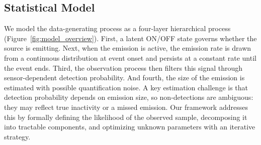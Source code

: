 \documentclass[unnumsec,webpdf,modern,mediumone]{oup-authoring-template}
\begin{document}
\subsection{Statistical Model}
\label{sec:stat_model}

We model the data-generating process as a four-layer hierarchical process (Figure~\ref{fig:model_overview}). First, a latent ON/OFF state governs whether the source is emitting. Next, when the emission is active, the emission rate is drawn from a continuous distribution at event onset and persists at a constant rate until the event ends. Third, the observation process then filters this signal through sensor-dependent detection probability. And fourth, the size of the emission is estimated with possible quantification noise. A key estimation challenge is that detection probability depends on emission size, so non-detections are ambiguous: they may reflect true inactivity or a missed emission. Our framework addresses this by formally defining the likelihood of the observed sample, decomposing it into tractable components, and optimizing unknown parameters with an iterative strategy.
\end{document}
